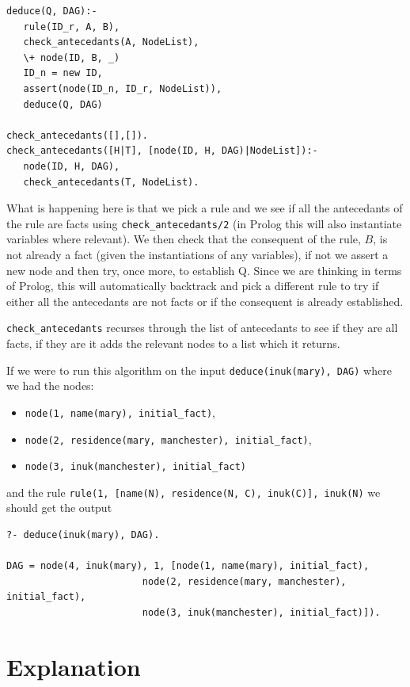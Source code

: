 \documentclass{blue-book}
\begin{document}
\begin{verbatim}
deduce(Q, DAG):-
   rule(ID_r, A, B),
   check_antecedants(A, NodeList),
   \+ node(ID, B, _)
   ID_n = new ID,
   assert(node(ID_n, ID_r, NodeList)),
   deduce(Q, DAG)
	
check_antecedants([],[]).
check_antecedants([H|T], [node(ID, H, DAG)|NodeList]):-
   node(ID, H, DAG),
   check_antecedants(T, NodeList).
\end{verbatim}
What is happening here is that we pick a rule and we see if all the antecedants of the rule are facts using \texttt{check\_antecedants/2} (in Prolog this will also instantiate variables where relevant).  We then check that the consequent of the rule, $B$, is not already a fact (given the instantiations of any variables), if not we assert a new node and then try, once more, to establish Q.  Since we are thinking in terms of Prolog, this will automatically backtrack and pick a different rule to try if either all the antecedants are not facts or if the consequent is already established.
	
\texttt{check\_antecedants} recurses through the list of antecedants to see if they are all facts, if they are it adds the relevant nodes to a list which it returns.


If we were to run this algorithm on the input \texttt{deduce(inuk(mary), DAG)} where we had the nodes: 
\begin{itemize}
\item \texttt{node(1, name(mary), initial\_fact)}, 
\item \texttt{node(2, residence(mary, manchester), initial\_fact)}, 
\item \texttt{node(3, inuk(manchester), initial\_fact)} 
\end{itemize} and the rule \texttt{rule(1, [name(N), residence(N, C), inuk(C)], inuk(N)} we should get the output

\begin{verbatim}
?- deduce(inuk(mary), DAG).

DAG = node(4, inuk(mary), 1, [node(1, name(mary), initial_fact), 
                        node(2, residence(mary, manchester), initial_fact), 
                        node(3, inuk(manchester), initial_fact)]).
\end{verbatim}

\section{Explanation}
\end{document}
